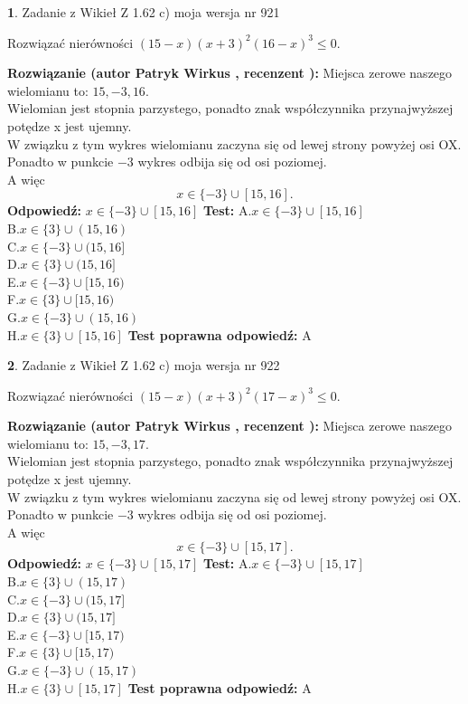 \documentclass[12pt, a4paper]{article}
\theoremstyle{definition} %
\newtheorem{zad}{}
\newcommand{\zadStart}[1]{\begin{zad}#1\newline}
\newcommand{\zadStop}{\end{zad}}
\newcommand{\rozwStart}[2]{\noindent \textbf{Rozwiązanie (autor #1 , recenzent #2): }\newline}
\newcommand{\rozwStop}{\newline}
\newcommand{\odpStart}{\noindent \textbf{Odpowiedź:}\newline}
\newcommand{\odpStop}{\newline}
\newcommand{\testStart}{\noindent \textbf{Test:}\newline}
\newcommand{\testStop}{\newline}
\newcommand{\kluczStart}{\noindent \textbf{Test poprawna odpowiedź:}\newline}
\newcommand{\kluczStop}{\newline}
\begin{document}
\zadStart{Zadanie z Wikieł Z 1.62 c) moja wersja nr 921}

Rozwiązać nierówności $(15-x)(x+3)^{2}(16-x)^{3}\le0$.
\zadStop
\rozwStart{Patryk Wirkus}{}
Miejsca zerowe naszego wielomianu to: $15, -3, 16$.\\
Wielomian jest stopnia parzystego, ponadto znak współczynnika przy\linebreak najwyższej potędze x jest ujemny.\\ W związku z tym wykres wielomianu zaczyna się od lewej strony powyżej osi OX.\\
Ponadto w punkcie $-3$ wykres odbija się od osi poziomej.\\
A więc $$x \in \{-3\} \cup [15,16].$$
\rozwStop
\odpStart
$x \in \{-3\} \cup [15,16]$
\odpStop
\testStart
A.$x \in \{-3\} \cup [15,16]$\\
B.$x \in \{3\} \cup (15,16)$\\
C.$x \in \{-3\} \cup (15,16]$\\
D.$x \in \{3\} \cup (15,16]$\\
E.$x \in \{-3\} \cup [15,16)$\\
F.$x \in \{3\} \cup [15,16)$\\
G.$x \in \{-3\} \cup (15,16)$\\
H.$x \in \{3\} \cup [15,16]$
\testStop
\kluczStart
A
\kluczStop



\zadStart{Zadanie z Wikieł Z 1.62 c) moja wersja nr 922}

Rozwiązać nierówności $(15-x)(x+3)^{2}(17-x)^{3}\le0$.
\zadStop
\rozwStart{Patryk Wirkus}{}
Miejsca zerowe naszego wielomianu to: $15, -3, 17$.\\
Wielomian jest stopnia parzystego, ponadto znak współczynnika przy\linebreak najwyższej potędze x jest ujemny.\\ W związku z tym wykres wielomianu zaczyna się od lewej strony powyżej osi OX.\\
Ponadto w punkcie $-3$ wykres odbija się od osi poziomej.\\
A więc $$x \in \{-3\} \cup [15,17].$$
\rozwStop
\odpStart
$x \in \{-3\} \cup [15,17]$
\odpStop
\testStart
A.$x \in \{-3\} \cup [15,17]$\\
B.$x \in \{3\} \cup (15,17)$\\
C.$x \in \{-3\} \cup (15,17]$\\
D.$x \in \{3\} \cup (15,17]$\\
E.$x \in \{-3\} \cup [15,17)$\\
F.$x \in \{3\} \cup [15,17)$\\
G.$x \in \{-3\} \cup (15,17)$\\
H.$x \in \{3\} \cup [15,17]$
\testStop
\kluczStart
A
\kluczStop
\end{document}
